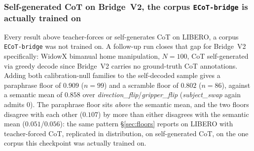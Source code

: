 \subsubsection{Self-generated CoT on Bridge~V2, the corpus \texttt{ECoT-bridge} is actually trained on}
\label{sec:cross_corpus}

Every result above teacher-forces or self-generates CoT on LIBERO, a corpus \texttt{ECoT-bridge} was not trained on. A follow-up run closes that gap for Bridge~V2 specifically: WidowX bimanual home manipulation, $N{=}100$, CoT self-generated via greedy decode since Bridge~V2 carries no ground-truth CoT annotations. Adding both calibration-null families to the self-decoded sample gives a paraphrase floor of $0.909$ ($n{=}99$) and a scramble floor of $0.802$ ($n{=}86$), against a semantic mean of $0.858$ over \emph{direction\_flip}/\emph{gripper\_flip} (\emph{subject\_swap} again admits $0$). The paraphrase floor sits \emph{above} the semantic mean, and the two floors disagree with each other ($0.107$) by more than either disagrees with the semantic mean ($0.051$/$0.056$): the same pattern \S\ref{sec:floors} reports on LIBERO with teacher-forced CoT, replicated in distribution, on self-generated CoT, on the one corpus this checkpoint was actually trained on.

